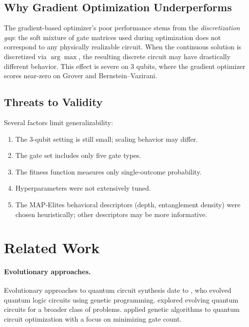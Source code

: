 \documentclass[twocolumn,11pt]{article}
\begin{document}
\subsection{Why Gradient Optimization Underperforms}

The gradient-based optimizer's poor performance stems from the
\emph{discretization gap}: the soft mixture of gate matrices used during
optimization does not correspond to any physically realizable circuit.  When the
continuous solution is discretized via $\arg\max$, the resulting discrete
circuit may have drastically different behavior.  This effect is severe on 3
qubits, where the gradient optimizer scores near-zero on Grover and
Bernstein--Vazirani.

\subsection{Threats to Validity}

Several factors limit generalizability:
\begin{enumerate}[nosep]
    \item The 3-qubit setting is still small; scaling behavior may differ.
    \item The gate set includes only five gate types.
    \item The fitness function measures only single-outcome probability.
    \item Hyperparameters were not extensively tuned.
    \item The MAP-Elites behavioral descriptors (depth, entanglement density)
          were chosen heuristically; other descriptors may be more informative.
\end{enumerate}

\section{Related Work}\label{sec:related}

\paragraph{Evolutionary approaches.}
Evolutionary approaches to quantum circuit synthesis date to
\citet{williams1998automated}, who evolved quantum logic circuits using genetic
programming.  \citet{massey2005evolving} explored evolving quantum circuits for
a broader class of problems.  \citet{las2016genetic} applied genetic algorithms
to quantum circuit optimization with a focus on minimizing gate count.
\end{document}
